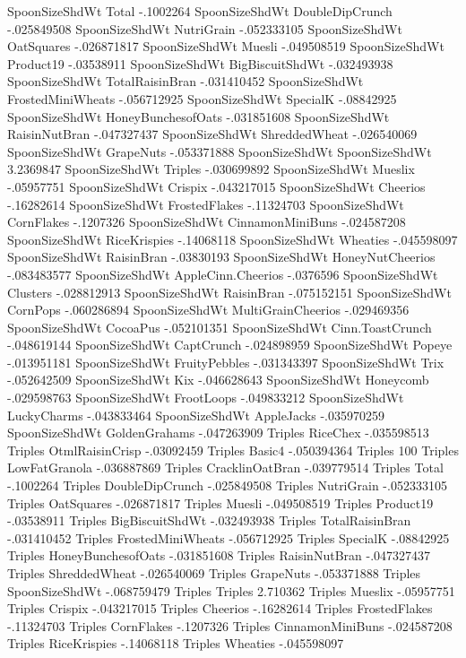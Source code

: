 SpoonSizeShdWt	Total	-.1002264
SpoonSizeShdWt	DoubleDipCrunch	-.025849508
SpoonSizeShdWt	NutriGrain	-.052333105
SpoonSizeShdWt	OatSquares	-.026871817
SpoonSizeShdWt	Muesli	-.049508519
SpoonSizeShdWt	Product19	-.03538911
SpoonSizeShdWt	BigBiscuitShdWt	-.032493938
SpoonSizeShdWt	TotalRaisinBran	-.031410452
SpoonSizeShdWt	FrostedMiniWheats	-.056712925
SpoonSizeShdWt	SpecialK	-.08842925
SpoonSizeShdWt	HoneyBunchesofOats	-.031851608
SpoonSizeShdWt	RaisinNutBran	-.047327437
SpoonSizeShdWt	ShreddedWheat	-.026540069
SpoonSizeShdWt	GrapeNuts	-.053371888
SpoonSizeShdWt	SpoonSizeShdWt	3.2369847
SpoonSizeShdWt	Triples	-.030699892
SpoonSizeShdWt	Mueslix	-.05957751
SpoonSizeShdWt	Crispix	-.043217015
SpoonSizeShdWt	Cheerios	-.16282614
SpoonSizeShdWt	FrostedFlakes	-.11324703
SpoonSizeShdWt	CornFlakes	-.1207326
SpoonSizeShdWt	CinnamonMiniBuns	-.024587208
SpoonSizeShdWt	RiceKrispies	-.14068118
SpoonSizeShdWt	Wheaties	-.045598097
SpoonSizeShdWt	RaisinBran	-.03830193
SpoonSizeShdWt	HoneyNutCheerios	-.083483577
SpoonSizeShdWt	AppleCinn.Cheerios	-.0376596
SpoonSizeShdWt	Clusters	-.028812913
SpoonSizeShdWt	RaisinBran	-.075152151
SpoonSizeShdWt	CornPops	-.060286894
SpoonSizeShdWt	MultiGrainCheerios	-.029469356
SpoonSizeShdWt	CocoaPus	-.052101351
SpoonSizeShdWt	Cinn.ToastCrunch	-.048619144
SpoonSizeShdWt	CaptCrunch	-.024898959
SpoonSizeShdWt	Popeye	-.013951181
SpoonSizeShdWt	FruityPebbles	-.031343397
SpoonSizeShdWt	Trix	-.052642509
SpoonSizeShdWt	Kix	-.046628643
SpoonSizeShdWt	Honeycomb	-.029598763
SpoonSizeShdWt	FrootLoops	-.049833212
SpoonSizeShdWt	LuckyCharms	-.043833464
SpoonSizeShdWt	AppleJacks	-.035970259
SpoonSizeShdWt	GoldenGrahams	-.047263909
Triples	RiceChex	-.035598513
Triples	OtmlRaisinCrisp	-.03092459
Triples	Basic4	-.050394364
Triples	100%
Triples	LowFatGranola	-.036887869
Triples	CracklinOatBran	-.039779514
Triples	Total	-.1002264
Triples	DoubleDipCrunch	-.025849508
Triples	NutriGrain	-.052333105
Triples	OatSquares	-.026871817
Triples	Muesli	-.049508519
Triples	Product19	-.03538911
Triples	BigBiscuitShdWt	-.032493938
Triples	TotalRaisinBran	-.031410452
Triples	FrostedMiniWheats	-.056712925
Triples	SpecialK	-.08842925
Triples	HoneyBunchesofOats	-.031851608
Triples	RaisinNutBran	-.047327437
Triples	ShreddedWheat	-.026540069
Triples	GrapeNuts	-.053371888
Triples	SpoonSizeShdWt	-.068759479
Triples	Triples	2.710362
Triples	Mueslix	-.05957751
Triples	Crispix	-.043217015
Triples	Cheerios	-.16282614
Triples	FrostedFlakes	-.11324703
Triples	CornFlakes	-.1207326
Triples	CinnamonMiniBuns	-.024587208
Triples	RiceKrispies	-.14068118
Triples	Wheaties	-.045598097
